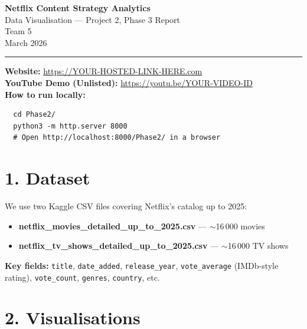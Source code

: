 \documentclass[11pt,a4paper]{article}
\begin{document}

\begin{center}
  {\LARGE\bfseries\textcolor{netflix}{N}etflix Content Strategy Analytics}\\[6pt]
  {\large Data Visualisation — Project 2, Phase 3 Report}\\[10pt]
  {\normalsize Team 5}\\[4pt]
  {\small March 2026}
\end{center}

\vspace{4pt}
\noindent\rule{\textwidth}{0.4pt}
\vspace{4pt}

\noindent\textbf{Website:} \url{https://YOUR-HOSTED-LINK-HERE.com}\\
\noindent\textbf{YouTube Demo (Unlisted):} \url{https://youtu.be/YOUR-VIDEO-ID}\\
\noindent\textbf{How to run locally:}
\begin{verbatim}
  cd Phase2/
  python3 -m http.server 8000
  # Open http://localhost:8000/Phase2/ in a browser
\end{verbatim}

\section{1. Dataset}

We use two Kaggle CSV files covering Netflix's catalog up to 2025:

\begin{itemize}[nosep]
  \item \textbf{netflix\_movies\_detailed\_up\_to\_2025.csv} — $\sim$16\,000 movies
  \item \textbf{netflix\_tv\_shows\_detailed\_up\_to\_2025.csv} — $\sim$16\,000 TV shows
\end{itemize}

\noindent\textbf{Key fields:} \texttt{title}, \texttt{date\_added}, \texttt{release\_year}, \texttt{vote\_average} (IMDb-style rating), \texttt{vote\_count}, \texttt{genres}, \texttt{country}, etc.

\section{2. Visualisations}
\end{document}
